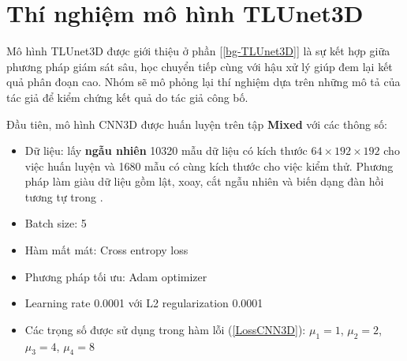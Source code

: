 \section{Thí nghiệm mô hình TLUnet3D} \label{exp-TLUnet3D}
Mô hình TLUnet3D được giới thiệu ở phần [\ref{bg-TLUnet3D}] là sự kết hợp giữa phương pháp giám sát sâu, học chuyển tiếp cùng với hậu xử lý giúp đem lại kết quả phân đoạn cao. Nhóm sẽ mô phỏng lại thí nghiệm dựa trên những mô tả của tác giả để kiểm chứng kết quả do tác giả công bố.\par
Đầu tiên, mô hình CNN3D được huấn luyện trên tập \textbf{Mixed} với các thông số:
\vspace{-5mm}
\begin{itemize}[itemsep=0pt, topsep=0pt]
    \item Dữ liệu: lấy \textbf{ngẫu nhiên} 10320 mẫu dữ liệu có kích thước $64 \times 192 \times 192$ cho việc huấn luyện và 1680 mẫu có cùng kích thước cho việc kiểm thử. Phương pháp làm giàu dữ liệu gồm lật, xoay, cắt ngẫu nhiên và biến dạng đàn hồi tương tự trong \cite{LV_LIVER}.
    \item Batch size: 5
    \item Hàm mất mát: Cross entropy loss
    \item Phương pháp tối ưu: Adam optimizer
    \item Learning rate 0.0001 với L2 regularization 0.0001
    \item Các trọng số được sử dụng trong hàm lỗi (\ref{LossCNN3D}): $\mu_{1} = 1$,  $\mu_{2} = 2$,  $\mu_{3} = 4$,  $\mu_{4} = 8$
\end{itemize}

